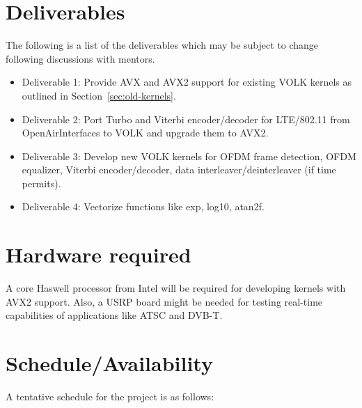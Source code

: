 \documentclass[a4paper,12pt,oneside]{article}
\begin{document}
\section{Deliverables}
The following is a list of the deliverables which may be subject to change following discussions with mentors. 
\begin{itemize}
\item Deliverable 1: Provide AVX and AVX2 support for existing VOLK kernels as outlined in Section~\ref{sec:old-kernels}.
\item Deliverable 2: Port Turbo and Viterbi encoder/decoder for LTE/802.11 from OpenAirInterfaces to VOLK and upgrade them to AVX2.
\item Deliverable 3: Develop new VOLK kernels for OFDM frame detection, OFDM equalizer, Viterbi encoder/decoder, data interleaver/deinterleaver (if time permits).
\item Deliverable 4: Vectorize functions like exp, log10, atan2f.
\end{itemize}

\section{Hardware required}

A core Haswell processor from Intel will be required for developing kernels with AVX2 support. Also, a USRP board might be needed for testing real-time capabilities of applications like ATSC and DVB-T. 

\section{Schedule/Availability}
A tentative schedule for the project is as follows: 
\end{document}
